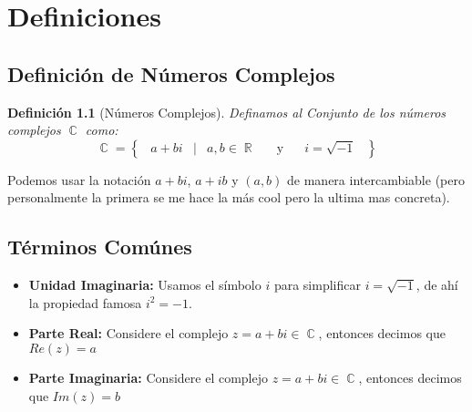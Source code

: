 \documentclass[12pt, fleqn]{report}                             %
\DeclareMathOperator \Space {\quad}                             %
\DeclareMathOperator \MiniSpace {\;}                            %
\newcommand \Such {\MiniSpace|\MiniSpace}                       %
\newcommand \Also {\Space \text{y} \Space}                      %
\newtheorem{Definition}{Definición}[section]                    %
\newcommand{\Set}[1]{\left\{ \MiniSpace #1 \MiniSpace \right\}} %
\DeclareMathOperator \Reals     {\mathbb{R}}                     %
\DeclareMathOperator \Complexs  {\mathbb{C}}                     %
\begin{document}
    \chapter{Definiciones}

        \clearpage
        \section{Definición de Números Complejos}

            \begin{Definition}[Números Complejos]
            \label{NumerosComplejos}
                Definamos al Conjunto de los números complejos $\Complexs$ como:
                \begin{equation}
                    \Complexs = 
                        \Set{ a + bi \Such a,b \in \Reals \Also i = \sqrt{-1} }
                \end{equation}

            \end{Definition}


            Podemos usar la notación $a+bi$, $a+ib$ y $(a, b)$ de manera intercambiable (pero personalmente 
            la primera se me hace la más cool pero la ultima mas concreta).


        \section{Términos Comúnes} 

            \begin{itemize}
                \item \textbf{Unidad Imaginaria:}
                    Usamos el símbolo $i$ para simplificar $i = \sqrt{-1}$, de ahí la propiedad
                    famosa $i^2 = -1$.

                \item \textbf{Parte Real:}
                    Considere el complejo $z = a+bi \in \Complexs$, entonces decimos que $Re(z) = a$

                \item \textbf{Parte Imaginaria:}
                    Considere el complejo $z = a+bi \in \Complexs$, entonces decimos que $Im(z) = b$
            \end{itemize}
\end{document}
